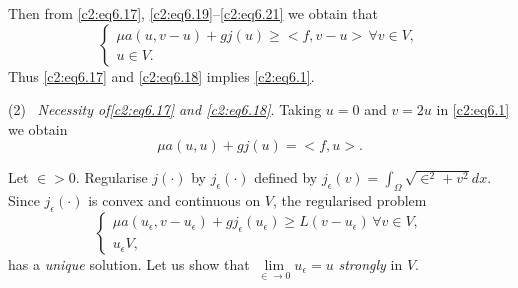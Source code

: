 Then from \eqref{c2:eq6.17}, \eqref{c2:eq6.19}--\eqref{c2:eq6.21} we
obtain that  
\begin{equation*}
\begin{cases}
\mu a (u, v-u) + gj (u) \geq <f, v-u>\, \forall  v \in V,\\
u \in V.
\end{cases}
\end{equation*}
Thus \eqref{c2:eq6.17} and \eqref{c2:eq6.18} implies \eqref{c2:eq6.1}.

\medskip
\noindent (2)~ {\em Necessity of\pageoriginale  \eqref{c2:eq6.17} and
  \eqref{c2:eq6.18}}. Taking  $u=0$ and $v = 2u$ 
  in \eqref{c2:eq6.1} we obtain  
\begin{equation}
\mu a(u, u)+ gj (u) = < f, u> .\tag{6.22}\label{c2:eq6.22}
\end{equation}

Let $\in > 0$. Regularise $j(\cdot)$ by $j_\epsilon (\cdot) $
defined by $j_\epsilon (v) = \int_\Omega \sqrt{\in^2 + v^2}
dx$. Since $j_\epsilon (\cdot) $ is convex and continuous on $V$, the
regularised problem  
\begin{equation}
\begin{cases}
\mu a (u_\epsilon , v - u_\epsilon ) +gj_\epsilon (u_\epsilon ) \geq
L(v-u_\epsilon )\, \forall  v \in V,\\ 
u_\epsilon V,
\end{cases}
\tag{6.23}\label{c2:eq6.23} 
\end{equation}
has a \textit{unique} solution. Let us show that
$\lim\limits_{\in \to 0} u_\epsilon = u$ \textit{strongly } in
$V$. 

